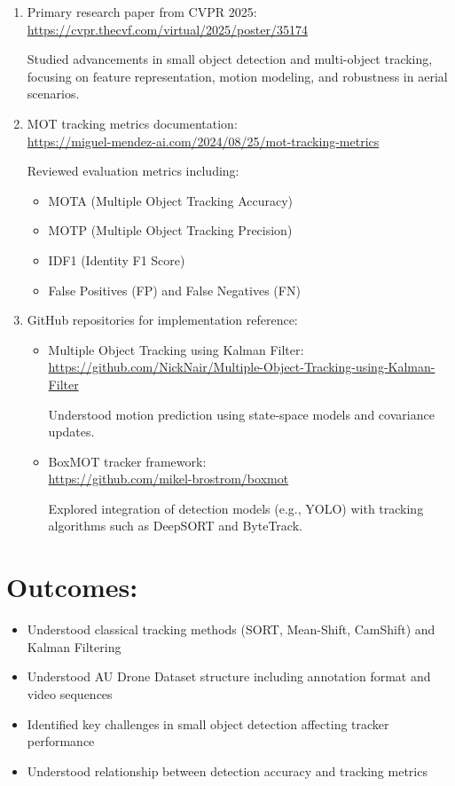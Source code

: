 \documentclass[11pt,a4paper]{article}
\begin{document}
	\begin{enumerate}[leftmargin=*]
		\item Primary research paper from CVPR 2025: \\
		\url{https://cvpr.thecvf.com/virtual/2025/poster/35174}
		
		Studied advancements in small object detection and multi-object tracking, focusing on feature representation, motion modeling, and robustness in aerial scenarios.
		
		\item MOT tracking metrics documentation: \\
		\url{https://miguel-mendez-ai.com/2024/08/25/mot-tracking-metrics}
		
		Reviewed evaluation metrics including:
		\begin{itemize}
			\item MOTA (Multiple Object Tracking Accuracy)
			\item MOTP (Multiple Object Tracking Precision)
			\item IDF1 (Identity F1 Score)
			\item False Positives (FP) and False Negatives (FN)
		\end{itemize}
		
		\item GitHub repositories for implementation reference:
		\begin{itemize}
			\item Multiple Object Tracking using Kalman Filter: \\
			\url{https://github.com/NickNair/Multiple-Object-Tracking-using-Kalman-Filter}
			
			Understood motion prediction using state-space models and covariance updates.
			
			\item BoxMOT tracker framework: \\
			\url{https://github.com/mikel-brostrom/boxmot}
			
			Explored integration of detection models (e.g., YOLO) with tracking algorithms such as DeepSORT and ByteTrack.
		\end{itemize}
	\end{enumerate}
	
	\section*{Outcomes:}
	
	\begin{itemize}[leftmargin=*]
		\item Understood classical tracking methods (SORT, Mean-Shift, CamShift) and Kalman Filtering
		\item Understood AU Drone Dataset structure including annotation format and video sequences
		\item Identified key challenges in small object detection affecting tracker performance
		\item Understood relationship between detection accuracy and tracking metrics
	\end{itemize}
	
\end{document}
